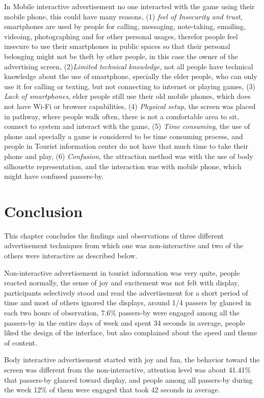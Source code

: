 In Mobile interactive advertisement no one interacted with the game using their mobile phone, this could have many reasons, (1) \emph{feel of Insecurity and trust}, smartphones are used by people for calling, messaging, note-taking, emailing, videoing, photographing and for other personal usages, therefor people feel insecure to use their smartphones in public spaces so that their personal belonging might not be theft by other people, in this case the owner of the advertising screen, (2)\emph{Limited technical knowledge}, not all people have technical knowledge about the use of smartphone, specially the elder people, who can only use it for calling or texting, but not connecting to internet or playing games, (3) \emph{Lack of smartphones}, elder people still use their old mobile phones, which does not have Wi-Fi or browser capabilities, (4) \emph{Physical setup}, the screen was placed in pathway, where people walk often, there is not a comfortable area to sit, connect to system and interact with the game, (5) \emph{Time consuming}, the use of phone and specially a game is considered to be time consuming process, and people in Tourist information center do not have that much time to take their phone and play, (6) \emph{Confusion}, the attraction method was with the use of body silhouette representation, and the interaction was with mobile phone, which might have confused passers-by. 


\section{Conclusion}
This chapter concludes the findings and observations of three different advertisement techniques from which one was non-interactive and two of the others were interactive as described below.

Non-interactive advertisement in tourist information was very quite, people reacted normally, the sense of joy and excitement was not felt with display, participants selectively stood and read the advertisement for a short period of time and most of others ignored the displays, around 1/4 passers by glanced in each two hours of observation, 7.6\% passers-by were engaged among all the passers-by in the entire days of week and spent 34 seconds in average, people liked the design of the interface, but also complained about the speed and theme of content.

Body interactive advertisement started with joy and fun, the behavior toward the screen was different from the non-interactive, attention level was about 41.41\% that passers-by glanced toward display, and people among all passers-by during the week 12\% of them were engaged that took 42 seconds in average.

